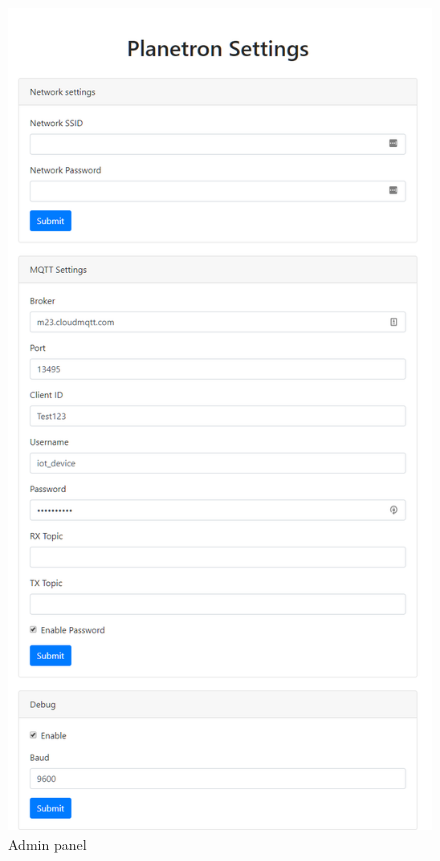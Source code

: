 \documentclass[11pt,a4paper]{article}
\begin{document}
\begin{figure}
\begin{center}
\includegraphics[scale=0.35]{admin_panel}
\end{center}
\caption{Admin panel}
\label{fig:adminPanel}
\end{figure}
\end{document}

